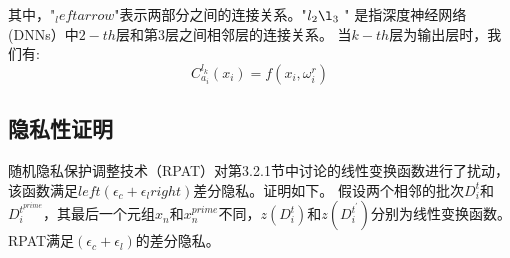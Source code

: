 其中，"$_leftarrow$"表示两部分之间的连接关系。"$l_{2} \l_{3}$ " 是指深度神经网络(DNNs）中$2-t h$层和第3层之间相邻层的连接关系。
当$k-t h$层为输出层时，我们有:
$$
C_{a_{i}}^{l_{k}}\left(x_{i}\right)=f\left(x_{i}, \omega_{i}^{r}\right)
$$

\subsection{隐私性证明}
随机隐私保护调整技术（RPAT）对第3.2.1节中讨论的线性变换函数进行了扰动，该函数满足$left(\epsilon_{c}+\epsilon_{l}right)$差分隐私。证明如下。
假设两个相邻的批次$D_{i}^{t}$和$D_{i}^{t^{prime}}$，其最后一个元组$x_{n}$和$x_{n}^{prime}$不同，$z\left(D_{i}^{t}\right)$和$z\left(D_{i}^{t^{\prime}}\right)$分别为线性变换函数。RPAT满足$\left(\epsilon_{c}+\epsilon_{l}\right)$的差分隐私。

